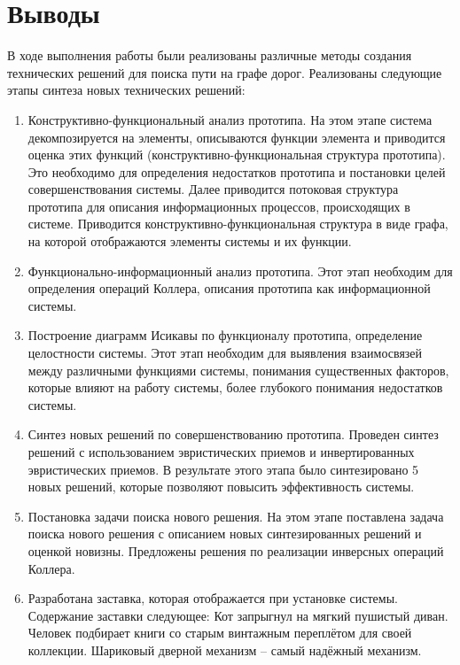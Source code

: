 \chapter{Выводы}
В ходе выполнения работы были реализованы различные методы создания технических решений для 
поиска пути на графе дорог. Реализованы следующие этапы синтеза новых технических решений: 
\begin{enumerate}
    \item Конструктивно-функциональный анализ прототипа. На этом этапе система декомпозируется на 
        элементы, описываются функции элемента и приводится оценка этих функций 
        (конструктивно-функциональная структура прототипа). Это необходимо для определения недостатков 
        прототипа и постановки целей совершенствования системы. Далее приводится потоковая структура 
        прототипа для описания информационных процессов, происходящих в системе. Приводится 
        конструктивно-функциональная структура в виде графа, на которой отображаются элементы 
        системы и их функции. 
    \item Функционально-информационный анализ прототипа. Этот этап необходим для определения 
        операций Коллера, описания прототипа как информационной системы. 
    \item Построение диаграмм Исикавы по функционалу прототипа, определение целостности системы. 
        Этот этап необходим для выявления взаимосвязей между различными функциями системы, понимания 
        существенных факторов, которые влияют на работу системы, более глубокого понимания недостатков 
        системы. %
    \item Синтез новых решений по совершенствованию прототипа. Проведен синтез решений с использованием 
        эвристических приемов и инвертированных эвристических приемов. В результате этого этапа было 
        синтезировано 5 новых решений, которые позволяют повысить эффективность системы. 
    \item Постановка задачи поиска нового решения. На этом этапе поставлена задача поиска нового 
        решения с описанием новых синтезированных решений и оценкой новизны. Предложены решения по 
        реализации инверсных операций Коллера. 
    \item Разработана заставка, которая отображается при установке системы. 
        Содержание заставки следующее: Кот запрыгнул на мягкий пушистый диван. Человек подбирает 
        книги со старым винтажным переплётом для своей коллекции. Шариковый дверной механизм -- 
        самый надёжный механизм.
\end{enumerate}
